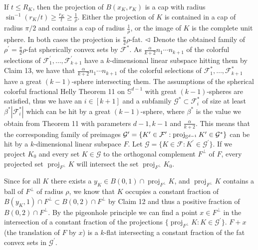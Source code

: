 \documentclass[10pt,a4paper]{amsart}
\begin{document}
\par
\par
If $t\leq R_{K}$, then the projection of $B(x_{K},r_{K})$ is a cap with radius $\sin^{-1}(r_{K}/t)\geq\frac{r_{K}}{t}\geq\frac{1}{\rho}$. Either the projection of $K$ is contained in a cap of radius $\pi/2$ and contains a cap of radius $\frac{1}{\rho}$, or the image of $K$ is the complete unit sphere. In both cases the projection is $\frac{\pi}{2}\rho$-fat. $\hfill\vartriangleleft$ Denote the obtained family of $\rho^{\prime}=\frac{\pi}{2}\rho$-fat spherically convex sets by $\mathcal{F}^{*}$. As $\frac{\alpha}{k+2}n_{1}\cdots n_{k+1}$ of the colorful selections of $\mathcal{F}_{1}^{\prime},\ldots,\mathcal{F}_{k+1}^{\prime}$ have a $k$-dimensional linear subspace hitting them by Claim 13, we have that $\frac{\alpha}{k+2}n_{1}\cdots n_{k+1}$ of the colorful selections of $\mathcal{F}_{1}^{*},\ldots,\mathcal{F}_{k+1}^{*}$ have a great $(k-1)$-sphere intersecting them. The assumptions of the spherical colorful fractional Helly Theorem 11 on $\mathbb{S}^{d-1}$ with great $(k-1)$-spheres are satisfied, thus we have an $i\in[k+1]$ and a subfamily $\mathcal{G}^{*}\subset\mathcal{F}_{i}^{*}$ of size at least $\beta^{*}|\mathcal{F}_{i}^{*}|$ which can be hit by a great $(k-1)$-sphere, where $\beta^{*}$ is the value we obtain from Theorem 11 with parameters $d-1,k-1$ and $\frac{\alpha}{k+2}$. This means that the corresponding family of preimages $\mathcal{G}^{\prime}=\{K^{\prime}\in\mathcal{F}^{\prime}:\operatorname{proj}_{%
\mathbb{S}^{d-1}}K^{\prime}\in\mathcal{G}^{*}\}$ can be hit by a $k$-dimensional linear subspace $F$. Let $\mathcal{G}=\{K\in\mathcal{F}:K^{\prime}\in\mathcal{G}^{\prime}\}$. If we project $K_{0}$ and every set $K\in\mathcal{G}$ to the orthogonal complement $F^{\perp}$ of $F$, every projected set $\operatorname{proj}_{F^{\perp}}K$ will intersect the set $\operatorname{proj}_{F^{\perp}}K_{0}$.
\par
\par
Since for all $K$ there exists a $y_{K}\in B(0,1)\cap\operatorname{proj}_{F^{\perp}}K$, and $\operatorname{proj}_{F^{\perp}}K$ contains a ball of $F^{\perp}$ of radius $\rho$, we know that $K$ occupies a constant fraction of $B(y_{K},1)\cap F^{\perp}\subset B(0,2)\cap F^{\perp}$ by Claim 12 and thus a positive fraction of $B(0,2)\cap F^{\perp}$. By the pigeonhole principle we can find a point $x\in F^{\perp}$ in the intersection of a constant fraction of the projections $\{\operatorname{proj}_{F^{\perp}}K:K\in\mathcal{G}^{\prime}\}$. $F+x$ (the translation of $F$ by $x$) is a $k$-flat intersecting a constant fraction of the fat convex sets in $\mathcal{G}^{\prime}$.
\end{document}
